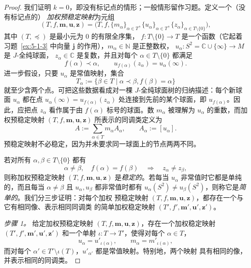 \begin{proof}
我们证明 $k=0$，即没有标记点的情形；一般情形留作习题。定义一个（没有标记点的）
\emph{加权预稳定映射}为元组
\[
  (T,f,\mathbf m,\mathbf u,\mathbf z)
  =\bigl(T,f,\{m_\alpha\}_{\alpha\in T},
    \{u_\alpha\}_{\alpha\in T},
    \{z_\alpha\}_{\alpha\in T\setminus\{0\}}\bigr),
\]
其中 $(T,\preceq)$ 是最小元为 $0$ 的有限全序集，
$f:T\setminus\{0\}\to T$ 是一个函数（它起着习题~\ref{ex:5-1-3} 中向量
$\mathbf j$ 的作用），$m_\alpha\in\mathbb N$ 是正整数权，
$u_\alpha:S^2=\mathbb C\cup\{\infty\}\to M$ 是 $J$-全纯球面，
$z_\alpha\in\mathbb C$ 是复数，并且对每个 $\alpha\in T\setminus\{0\}$ 都满足
\[
  f(\alpha)\prec\alpha,
  \qquad
  u_{f(\alpha)}(z_\alpha)=u_\alpha(\infty).
\]
进一步假设，只要 $u_\alpha$ 是常值映射，集合
\[
  T_\alpha:=\{\beta\in T\mid\alpha\prec\beta, f(\beta)=\alpha\}
\]
就至少含两个点。可把这些数据看成对一棵 $J$-全纯球面树的归纳描述：每个新球面
$u_\alpha$ 都在点
$u_\alpha(\infty)=u_{f(\alpha)}(z_\alpha)$ 处连接到先前的某个球面，即
$u_{f(\alpha)}$。因此，应把点 $z_\alpha$ 看作属于由 $f(\alpha)$ 标号的球面。数
$m_\alpha$ 被理解为 $u_\alpha$ 的重数，而加权预稳定映射
$(T,f,\mathbf m,\mathbf u,\mathbf z)$ 所表示的同调类定义为
\[
  A:=\sum_{\alpha\in T}m_\alpha A_\alpha,
  \qquad A_\alpha:=[u_\alpha].
\]
预稳定映射不必稳定，因为并未要求同一球面上的节点两两不同。

若对所有 $\alpha,\beta\in T\setminus\{0\}$ 都有
\[
  \alpha\ne\beta,\quad f(\alpha)=f(\beta)
  \quad\Longrightarrow\quad z_\alpha\ne z_\beta,
\]
则称加权预稳定映射 $(T,f,\mathbf m,\mathbf u,\mathbf z)$ 是\emph{稳定的}。若每当
$u_\alpha$ 非常值时它都是单纯的，而且每当 $\alpha\ne\beta$ 且
$u_\alpha,u_\beta$ 都非常值时都有
$u_\alpha(S^2)\ne u_\beta(S^2)$，则称它是\emph{简单的}。我们分三步证明：对每个加权
预稳定映射 $(T,f,\mathbf m,\mathbf u,\mathbf z)$，都存在一个与它有相同像、表示相同同调类
的简单加权稳定映射 $(T',f',\mathbf m',\mathbf u',\mathbf z')$。

\emph{步骤 1。}
给定加权预稳定映射 $(T,f,\mathbf m,\mathbf u,\mathbf z)$，存在一个加权稳定映射
$(T',f',\mathbf m',\mathbf u',\mathbf z')$ 和一个单射 $\iota:T\to T'$，使得对每个
$\alpha\in T$，
\[
  u_\alpha=u'_{\iota(\alpha)},
  \qquad m_\alpha=m'_{\iota(\alpha)},
\]
而对每个 $\alpha'\in T'\setminus\iota(T)$，$u'_{\alpha'}$ 都是常值映射。特别地，两个映射
具有相同的像，并表示相同的同调类。


\end{proof}
